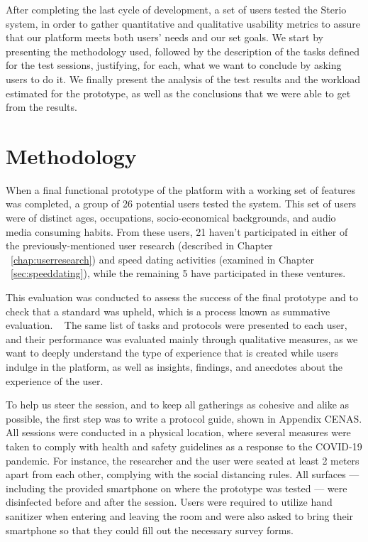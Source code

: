 \label{chap:evaluation}

After completing the last cycle of development, a set of users tested the Sterio system, in order to gather quantitative and qualitative usability metrics to assure that our platform meets both users’ needs and our set goals. We start by presenting the methodology used, followed by the description of the tasks defined for the test sessions, justifying, for each, what we want to conclude by asking users to do it. We finally present the analysis of the test results and the workload estimated for the prototype, as well as the conclusions that we were able to get from the results.


\section{Methodology}

When a final functional prototype of the platform with a working set of features was completed, a group of 26 potential users tested the system. This set of users were of distinct ages, occupations, socio-economical backgrounds, and audio media consuming habits. From these users, 21 haven't participated in either of the previously-mentioned user research (described in Chapter ~\ref{chap:userresearch}) and speed dating activities (examined in Chapter ~\ref{sec:speeddating}), while the remaining 5 have participated in these ventures.

This evaluation was conducted to assess the success of the final prototype and to check that a standard was upheld, which is a process known as summative evaluation. ~\cite{Preece2015, Courage2005} The same list of tasks and protocols were presented to each user, and their performance was evaluated mainly through qualitative measures, as we want to deeply understand the type of experience that is created while users indulge in the platform, as well as insights, findings, and anecdotes about the experience of the user.

To help us steer the session, and to keep all gatherings as cohesive and alike as possible, the first step was to write a protocol guide, shown in Appendix CENAS. All sessions were conducted in a physical location, where several measures were taken to comply with health and safety guidelines as a response to the COVID-19 pandemic. For instance, the researcher and the user were seated at least 2 meters apart from each other, complying with the social distancing rules. All surfaces — including the provided smartphone on where the prototype was tested — were disinfected before and after the session. Users were required to utilize hand sanitizer when entering and leaving the room and were also asked to bring their smartphone so that they could fill out the necessary survey forms. 

